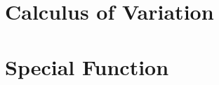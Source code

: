 \documentclass[10pt]{article}
\theoremstyle{definition}
\begin{document}
\section*{Calculus of Variation}

\clearpage


\section*{Special Function}

\clearpage



\printbibliography
\end{document}
